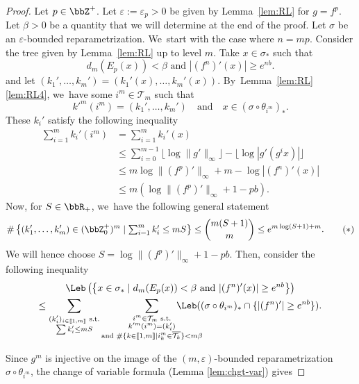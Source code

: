 \begin{proof}
Let $p \in \bbZ^+$. Let $\varepsilon := \varepsilon_p > 0$ be given by Lemma~\ref{lem:RL} for $g = f^p$.
Let $\beta > 0$ be a quantity that we will determine at the end of the proof.
Let $\sigma$ be an $\varepsilon$-bounded reparametrization. We~start with the case where $n = mp$.
Consider the tree given by Lemma~\ref{lem:RL} up to level $m$.
Take $x \in \sigma_*$ such that
\[
d_m(E_p(x)) < \beta \text{ and } |(f^n)'(x)| \geq e^{nb}.
\]
and let $(k_1',\dots, k_m') = (k_1'(x),\dots, k_m'(x))$. By~Lemma~\ref{lem:RL}\eqref{lem:RL4}, we~have some $i^m \in \mathcal{T}_m$ such that
\[
k'^m(i^m) = (k_1',\dots, k_m') \quad \text{and} \quad x \in \left (\sigma \circ \theta_{i^m} \right)_*.
\]
These $k_i'$ satisfy the following inequality
\begin{align*}
\sum_{i=1}^m k_i'(i^m)
&= \sum_{i=1}^m k_i'(x)\\
&\leq \sum_{i=0}^{m-1} \lfloor \log \| g' \|_{\infty} \rfloor - \lfloor \log |g'(g^i x)| \rfloor\\
&\leq m \log \| (f^p)' \|_{\infty} + m - \log |(f^n)'(x)|\\
&\leq m \left (\log \| (f^p)'\|_{\infty} + 1 - pb \right).
\end{align*}
Now, for $S \in \bbR_+$, we~have the following general statement
\begin{align}
\# \left \{ (k_1',\dots, k_m') \in (\bbZ_0^+)^m \mid \textstyle\sum_{i = 1}^m k_i' \leq m S \right \} \leq {\binom{m(S+1)} m} \leq e^{m \log (S+1) + m}.
\tag{$*$}
\label{ineq:3-1}
\end{align}
We will hence choose $S = \log \| (f^p)'\|_{\infty} + 1 - pb$. Then, consider the following inequality
\begin{multline*}
\Leb\left (\left \{ x \in \sigma_* \mid d_m(E_p(x)) < \beta \text{ and } | (f^n)'(x) | \geq e^{nb}\right \} \right)\\
\leq \sum_{\substack{(k_i')_{i \in [\![ 1, m ]\!]} \text{ s.t.}\\
\sum k_i' \leq m S}} \sum_{\substack{i^m \in \mathcal{T}_m \text{ s.t.}\\
k'^m(i^m) = (k_i')\\
\text{and } \# \{ k \in [\![ 1, m ]\!] \mid i^m_k \in \overline{\mathcal{T}_k} \} < m \beta}}
\hspace{-10mm}\Leb ((\sigma \circ \theta_{i^m})_* \cap \{ |(f^n)'| \geq e^{nb} \}).
\end{multline*}
\noindent
\begin{minipage}{\textwidth}
Since $g^m$ is injective on the image of the $(m, \varepsilon)$-bounded reparametrization $\sigma \circ \theta_{i^m}$, the change of variable formula (Lemma \ref{lem:chgt-var}) gives

\end{minipage}
\end{proof}
